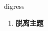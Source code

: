 
\begin{frame}
{\huge digress}
\begin{center}
\begin{enumerate}\Large
  \item \textbf{脱离主题}
\end{enumerate}
\end{center}
\end{frame}
